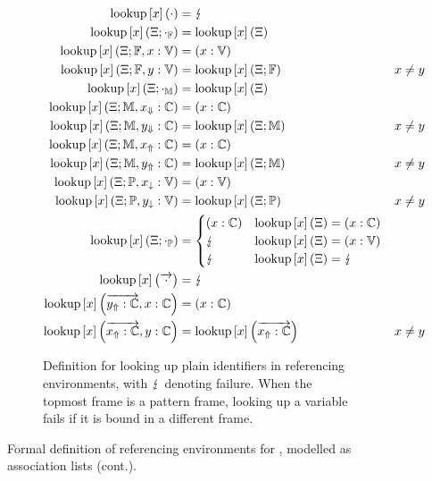 \begin{figure}[htb]
\begin{subfigure}{\linewidth}
\begin{equation*}
\begin{aligned}
\Lookup{x}{\cdot} &= \Fail\\
\Lookup{x}{\Env; \cdot_\Frame} &= \Lookup{x}{\Env}\\
\Lookup{x}{\Env; \Frame, x : \Var} &= (x : \Var)\\
\Lookup{x}{\Env; \Frame, y : \Var} &= \Lookup{x}{\Env; \Frame} & x \neq y\\
\Lookup{x}{\Env; \cdot_\Module} &= \Lookup{x}{\Env}\\
\Lookup{x}{\Env; \Module, \Private{x} : \Constant} &= (x : \Constant)\\
\Lookup{x}{\Env; \Module, \Private{y} : \Constant} &= \Lookup{x}{\Env; \Module} & x \neq y\\
\Lookup{x}{\Env; \Module, \Public{x} : \Constant} &= (x : \Constant)\\
\Lookup{x}{\Env; \Module, \Public{y} : \Constant} &= \Lookup{x}{\Env; \Module} & x \neq y\\
\Lookup{x}{\Env; \Pattern, \private{x} : \Var} &= (x : \Var)\\
\Lookup{x}{\Env; \Pattern, \private{y} : \Var} &= \Lookup{x}{\Env; \Pattern} & x \neq y\\
\Lookup{x}{\Xi; \cdot_\Pattern} &= \begin{cases}
(x : \Constant) & \Lookup{x}{\Xi} = (x : \Constant)\\
\Fail & \Lookup{x}{\Xi} = (x : \Var)\\
\Fail & \Lookup{x}{\Xi} = \Fail
\end{cases}\\
\Lookup{x}{\overrightarrow{\cdot}} &= \Fail\\
\Lookup{x}{\overrightarrow{\Public{y} : \Constant}, x : \Constant} &= (x : \Constant)\\
\Lookup{x}{\overrightarrow{\Public{x} : \Constant}, y : \Constant} &= \Lookup{x}{\overrightarrow{\Public{x} : \Constant}} & x \neq y
\end{aligned}
\end{equation*}
\caption{%
Definition for looking up plain identifiers in referencing environments, with $\Fail$ denoting failure.
When the topmost frame is a pattern frame, looking up a variable fails if it is bound in a different frame.
}
\end{subfigure}
\caption[]{%
Formal definition of referencing environments for \Beluga, modelled as association lists (cont.).
}
\label{figure:definition-lookup-formal}
\end{figure}

